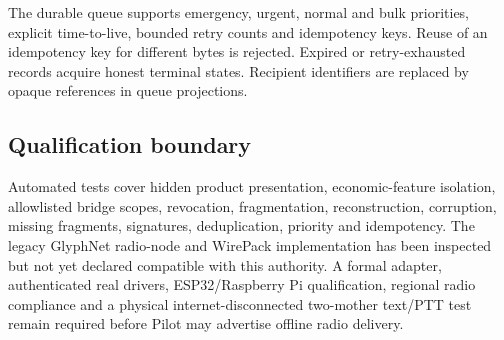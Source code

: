 The durable queue supports emergency, urgent, normal and bulk priorities, explicit
time-to-live, bounded retry counts and idempotency keys.  Reuse of an idempotency key
for different bytes is rejected.  Expired or retry-exhausted records acquire honest
terminal states.  Recipient identifiers are replaced by opaque references in queue
projections.

\subsection{Qualification boundary}

Automated tests cover hidden product presentation, economic-feature isolation,
allowlisted bridge scopes, revocation, fragmentation, reconstruction, corruption,
missing fragments, signatures, deduplication, priority and idempotency.  The legacy
GlyphNet radio-node and WirePack implementation has been inspected but not yet
declared compatible with this authority.  A formal adapter, authenticated real
drivers, ESP32/Raspberry Pi qualification, regional radio compliance and a physical
internet-disconnected two-mother text/PTT test remain required before Pilot may
advertise offline radio delivery.
